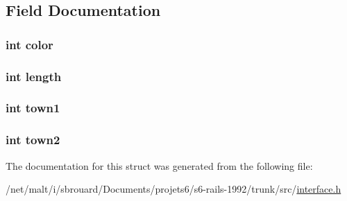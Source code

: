 \subsection{Field Documentation}
\hypertarget{structRail_a0fd02fb9277ffcb35a75066ffe95e8c7}{
\subsubsection[{color}]{\setlength{\rightskip}{0pt plus 5cm}int color}}\label{structRail_a0fd02fb9277ffcb35a75066ffe95e8c7}
\hypertarget{structRail_a9f59b34b1f25fe00023291b678246bcc}{
\subsubsection[{length}]{\setlength{\rightskip}{0pt plus 5cm}int length}}\label{structRail_a9f59b34b1f25fe00023291b678246bcc}
\hypertarget{structRail_a98fff246793d7da82f5befd043b04451}{
\subsubsection[{town1}]{\setlength{\rightskip}{0pt plus 5cm}int town1}}\label{structRail_a98fff246793d7da82f5befd043b04451}
\hypertarget{structRail_a38f94b482519ddfc27b054eb3dde308e}{
\subsubsection[{town2}]{\setlength{\rightskip}{0pt plus 5cm}int town2}}\label{structRail_a38f94b482519ddfc27b054eb3dde308e}


The documentation for this struct was generated from the following file\-:\begin{DoxyCompactItemize}
\item 
/net/malt/i/sbrouard/\-Documents/projets6/s6-\/rails-\/1992/trunk/src/\hyperlink{interface_8h}{interface.\-h}\end{DoxyCompactItemize}
